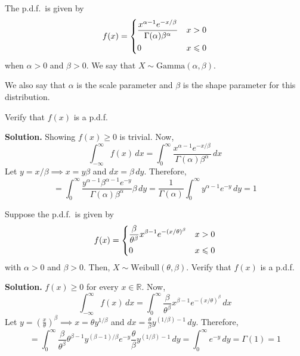 \begin{Example}{}{}
    The p.d.f.\ is given by
    \[ f(x)=\begin{dcases}
            \frac{x^{\alpha-1}e^{-x/\beta}}{\Gamma(\alpha)\beta^\alpha} & x>0          \\
            0                                                           & x\leqslant 0
        \end{dcases}
    \]
    when $ \alpha>0 $ and $ \beta>0 $. We say that $ X \sim \text{Gamma}(\alpha,\beta) $.

    We also say that $ \alpha $ is the scale parameter and $ \beta $ is the shape parameter
    for this distribution.

    Verify that $ f(x) $ is a p.d.f.

    \textbf{Solution.} Showing $ f(x)\geqslant 0 $ is trivial. Now,
    \[ \int_{-\infty}^{\infty} f(x)\, d{x} =
        \int_{0}^{\infty} \frac{x^{\alpha-1}e^{-x/\beta}}{\Gamma(\alpha)
        \beta^{\alpha}} \, d{x}  \]
    Let $ y=x/\beta\implies x=y\beta $ and $ dx=\beta\,dy $.
    Therefore,
    \[ =\int_{0}^{\infty}
        \frac{y^{\alpha-1}\beta^{\alpha-1}e^{-y}}{\Gamma(\alpha)\beta^\alpha}\beta  \, d{y}
        =\frac{1}{\Gamma(\alpha)}\int_{0}^{\infty} y^{\alpha-1}e^{-y}\, d{y}=1    \]
\end{Example}

\begin{Example}{}{}
    Suppose the p.d.f.\ is given by
    \[ f(x)=\begin{dcases}
            \frac{\beta}{\theta^\beta}x^{\beta-1}e^{-\left( x/\theta  \right)^\beta} & x>0          \\
            0                                                                        & x\leqslant 0
        \end{dcases} \]
    with $ \alpha>0 $ and $ \beta>0 $.
    Then, $ X \sim \text{Weibull}(\theta,\beta) $.
    Verify that $ f(x) $ is a p.d.f.

    \textbf{Solution.} $ f(x)\geqslant 0 $ for every $ x\in\mathbb{R} $. Now,
    \[ \displaystyle \int_{-\infty}^{\infty} f(x)\, d{x} =
        \int_{0}^{\infty} \frac{\beta}{\theta^\beta}x^{\beta-1}e^{-\left( x/\theta  \right)^\beta} \, d{x} \]
    Let $ y=\left( \frac{x}{\theta}  \right)^\beta \implies
        x=\theta y^{1/\beta} $ and $ dx=\frac{\theta}{\beta} y^{(1/\beta)-1}\,dy $.
    Therefore,
    \[ =\int_{0}^{\infty} \frac{\beta}{\theta^\beta} \theta^{\beta-1}
        y^{(\beta-1)/\beta}e^{-y}\frac{\theta}{\beta} y^{(1/\beta)-1}\, d{y}
        =\int_{0}^{\infty} e^{-y}\, d{y}=\Gamma(1)=1  \]
\end{Example}

